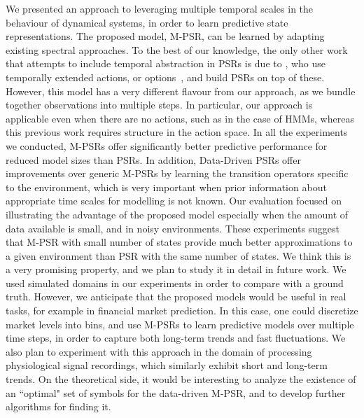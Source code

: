 \documentclass[letterpaper]{article}
\begin{document}
We presented an approach to leveraging multiple temporal scales in the behaviour of dynamical systems, in order to learn predictive state representations.  The proposed model, M-PSR, can be learned by adapting existing spectral approaches. To the best of our knowledge, the only other work that attempts to include temporal abstraction in PSRs is due to \cite{wolfe06}, who use temporally extended actions, or options~\cite{sutton99}, and build PSRs on top of these. However, this model has a very different flavour from our approach, as we bundle together observations into multiple steps. In particular, our approach is applicable even when there are no actions, such as in the case of HMMs, whereas this previous work requires structure in the action space. In all the experiments we conducted, M-PSRs offer significantly better predictive performance for reduced model sizes than PSRs. In addition, Data-Driven PSRs offer improvements over generic M-PSRs by learning the transition operators specific to the environment, which is very important when prior information about appropriate time scales for modelling is not known. Our evaluation focused on illustrating the advantage of the proposed model especially when the amount of data available is small, and in noisy environments. These experiments suggest that M-PSR with small number of states provide much better approximations to a given environment than PSR with the same number of states. We think this is a very promising property, and we plan to study it in detail in future work. We used simulated domains in our experiments in order to compare with a ground truth. However, we anticipate that the proposed models would be useful in real tasks, for example in financial market prediction. In this case, one could discretize market levels into bins, and use M-PSRs to learn predictive models over multiple time steps, in order to capture both long-term trends and fast fluctuations. We also plan to experiment with this approach in the domain of processing physiological signal recordings, which similarly exhibit short and long-term trends. On the theoretical side, it would be interesting to analyze the existence of an ``optimal" set of symbols for the data-driven M-PSR, and to develop further algorithms for finding it.





\end{document}
